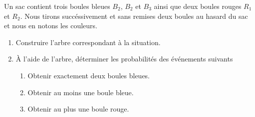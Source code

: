 
\begin{exercice}\label{exosmath-0708}

    Un sac contient trois boules bleues \( B_2\), \( B_2\) et \( B_3\) ainsi que deux boules rouges \( R_1\) et \( R_2\). Nous tirons succéssivement et sans remises deux boules au hasard du sac et nous en notons les couleurs.
    \begin{enumerate}
        \item
            Construire l'arbre correspondant à la situation.
        \item
            À l'aide de l'arbre, déterminer les probabilités des événements suivants
            \begin{enumerate}
                \item
                    Obtenir exactement deux boules bleues.
                \item
                    Obtenir au moins une boule bleue.
                \item
                    Obtenir au plus une boule rouge.
            \end{enumerate}
    \end{enumerate}

\end{exercice}
